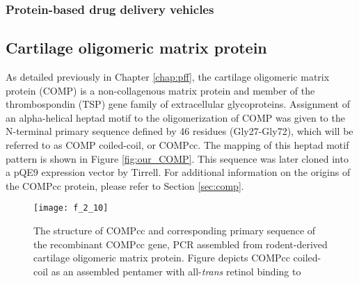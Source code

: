 \begin{refsection}
\subsubsection{Protein-based drug delivery vehicles}

\subsection{Cartilage oligomeric matrix protein}

As detailed previously in Chapter \ref{chap:pff}, the cartilage oligomeric
matrix protein (COMP) is a non-collagenous matrix protein and member of the
thrombospondin (TSP) gene family of extracellular
glycoproteins.\cite{Adams2001,Smith1997,Muller1998,Hedbom1992,Oldberg1992}
Assignment of an alpha-helical heptad motif to the oligomerization of COMP was
given to the N-terminal primary sequence defined by 46 residues
(Gly27-Gly72), which will be referred to as COMP coiled-coil, or
COMPcc.\cite{Efimov1994} The mapping of this heptad motif pattern is shown in
Figure \ref{fig:our_COMP}. This sequence was later cloned into a pQE9 expression
vector by Tirrell.\cite{Shen2006a} For additional information on the origins of
the COMPcc protein, please refer to Section
\ref{sec:comp}.
\begin{figure}[h!] \centering \texttt{[image: f\_2\_10]}
    \caption[The structure of COMPcc and corresponding primary
sequence of the recombinant COMPcc gene, PCR assembled from rodent-derived
cartilage oligomeric matrix protein. Figure depicts COMPcc
coiled-coil as an assembled pentamer with all-\emph{trans} retinol binding to
the pore region.  Right side of the figure present the structures of several
hydrophobic small molecules that have been shown to bind to the pore region,
including vitamin , all-\emph{trans} retinol, and
curcumin. The complete primary sequence of the PQE9-COMPcc
construct is shown with a mapping of an alpha-helical heptad motif onto the
residues. Highlighted features of the sequence include a His-tag
region, which is apart of the PQE9 expression vector, a delineation of the start
and end of rodent COMPcc (flanked by Gly27 and Gly72), and two point mutations
to promote assembly under non-reducing environemtns (Cys to Ser).]
    {The structure of COMPcc and corresponding primary
sequence of the recombinant COMPcc gene, PCR assembled from rodent-derived
cartilage oligomeric matrix protein.\cite{Shen2006a} Figure depicts COMPcc
coiled-coil as an assembled pentamer with all-\emph{trans} retinol binding to
}
\end{figure}
\end{refsection}
